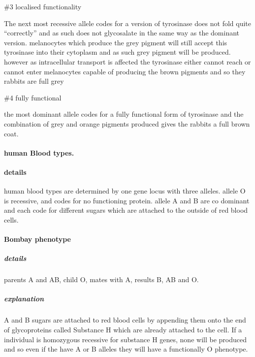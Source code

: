 \documentclass[]{article}
\let\oldparagraph\paragraph
\renewcommand{\paragraph}[1]{\oldparagraph{#1}\mbox{}}
\let\oldsubparagraph\subparagraph
\renewcommand{\subparagraph}[1]{\oldsubparagraph{#1}\mbox{}}
\begin{document}
\#3 localised functionality

The next most recessive allele codes for a version of tyrosinase does
not fold quite ``correctly'' and as such does not glycosalate in the
same way as the dominant version. melanocytes which produce the grey
pigment will still accept this tyrosinase into their cytoplasm and as
such grey pigment will be produced. however as intracellular transport
is affected the tyrosinase either cannot reach or cannot enter
melanocytes capable of producing the brown pigments and so they rabbits
are full grey

\#4 fully functional

the most dominant allele codes for a fully functional form of tyrosinase
and the combination of grey and orange pigments produced gives the
rabbits a full brown coat.

\hypertarget{human-blood-types.}{%
\paragraph{human Blood types.}\label{human-blood-types.}}

\hypertarget{details-2}{%
\paragraph{details}\label{details-2}}

human blood types are determined by one gene locus with three alleles.
allele O is recessive, and codes for no functioning protein. allele A
and B are co dominant and each code for different sugars which are
attached to the outside of red blood cells.

\hypertarget{bombay-phenotype}{%
\paragraph{Bombay phenotype}\label{bombay-phenotype}}

\hypertarget{details-3}{%
\subparagraph{details}\label{details-3}}

parents A and AB, child O, mates with A, results B, AB and O.

\hypertarget{explanation-2}{%
\subparagraph{explanation}\label{explanation-2}}

A and B sugars are attached to red blood cells by appending them onto
the end of glycoproteins called Substance H which are already attached
to the cell. If a individual is homozygous recessive for substance H
genes, none will be produced and so even if the have A or B alleles they
will have a functionally O phenotype.
\end{document}
